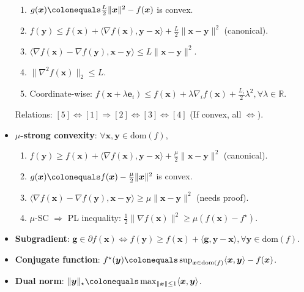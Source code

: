 \documentclass[8pt,a4paper]{extarticle}
\newcommand{\R}{\mathbb{R}}
\renewcommand{\vec}[1]{\bm{#1}}
\newcommand{\dom}[1]{\mathrm{dom}(#1)}
\newenvironment{topic}[1]
{\textbf{\sffamily \colorbox{black}{\rlap{\textbf{\textcolor{white}{#1}}}\hspace{\linewidth}\hspace{-2\fboxsep}}} \\ \vspace{0.2cm}}
{}
\begin{document}
\begin{multicols*}{2}
\begin{topic}{Definitions}
\begin{itemize}
\begin{enumerate}
                      \item $g(\vec{x}) \colonequals \frac{L}{2} \| \vec{x} \|^2 - f(\vec{x})$ is convex.
                      \item $f(\vec{y}) \leq f(\vec{x}) + \langle \nabla f(\vec{x}), \vec{y} - \vec{x} \rangle + \frac{L}{2} \| \vec{x} - \vec{y} \|^2$ (canonical).
                      \item $\langle \nabla f(\vec{x}) - \nabla f(\vec{y}), \vec{x} - \vec{y} \rangle \leq L \| \vec{x} - \vec{y} \|^2$.
                      \item $\| \nabla^2 f(\vec{x}) \|_2 \leq L$.
                      \item Coordinate-wise: $f(\vec{x} + \lambda \vec{e}_i) \leq f(\vec{x}) + \lambda \nabla_i f(\vec{x}) +
                                \frac{L_i}{2} \lambda^2, \forall \lambda \in \R$.
                  \end{enumerate}
                  Relations: $[5] \Leftrightarrow [1] \Rightarrow [2] \Leftrightarrow [3] \Leftrightarrow [4]$ (If convex, all $\Leftrightarrow$).
            \item \textbf{$\mu$-strong convexity}: $\forall \vec{x}, \vec{y} \in \dom{f}$,
                  \begin{enumerate}
                      \item $f(\vec{y}) \geq f(\vec{x}) + \langle \nabla f(\vec{x}), \vec{y} - \vec{x} \rangle + \frac{\mu}{2} \| \vec{x} - \vec{y} \|^2$ (canonical).
                      \item $g(\vec{x}) \colonequals f(\vec{x}) - \frac{\mu}{2} \| \vec{x} \|^2$ is convex.
                      \item $\langle \nabla f(\vec{x}) - \nabla f(\vec{y}), \vec{x} - \vec{y} \rangle \geq \mu \| \vec{x} - \vec{y} \|^2$ (needs proof).
                      \item $\mu$-SC $\Rightarrow$ PL inequality: $\frac{1}{2} \| \nabla f(\vec{x}) \|^2 \geq \mu (f(\vec{x}) - f^\star)$.
                  \end{enumerate}
            \item \textbf{Subgradient}: $\vec{g} \in \partial f(\vec{x}) \Leftrightarrow f(\vec{y}) \geq f(\vec{x}) + \langle \vec{g}, \vec{y} - \vec{x} \rangle, \forall \vec{y} \in \dom{f}$.
            \item \textbf{Conjugate function}: $f^\star(\vec{y}) \colonequals \sup_{\vec{x} \in \dom{f}} \langle \vec{x}, \vec{y} \rangle - f(\vec{x})$.
            \item \textbf{Dual norm}: $\| \vec{y} \|_\star \colonequals \max_{\| \vec{x} \| \leq 1} \langle \vec{x}, \vec{y} \rangle$.
        \end{itemize}
    \end{topic}


\end{multicols*}
\end{document}
